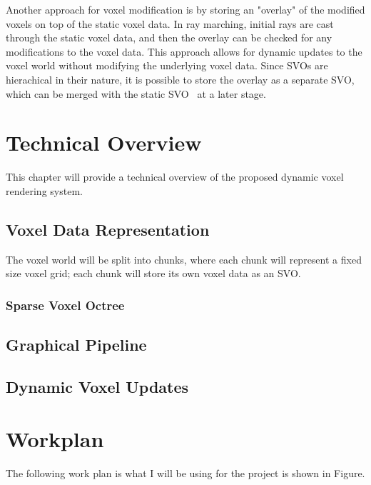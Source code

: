 \documentclass{article}
\begin{document}
Another approach for voxel modification is by storing an "overlay" of the modified voxels on top of the static voxel data. In ray marching, initial rays are cast through the static voxel data, and then the overlay can be checked for any modifications to the voxel data. This approach allows for dynamic updates to the voxel world without modifying the underlying voxel data. Since SVOs are hierachical in their nature, it is possible to store the overlay as a separate SVO, which can be merged with the static SVO~\cite{Douglas_2022} at a later stage.

\section{Technical Overview}
This chapter will provide a technical overview of the proposed dynamic voxel rendering system.

\subsection{Voxel Data Representation}
The voxel world will be split into chunks, where each chunk will represent a fixed size voxel grid; each chunk will store its own voxel data as an SVO.

\subsubsection{Sparse Voxel Octree}

\subsection{Graphical Pipeline}

\subsection{Dynamic Voxel Updates}

\section{Workplan}
The following work plan is what I will be using for the project is shown in Figure.



\end{document}
